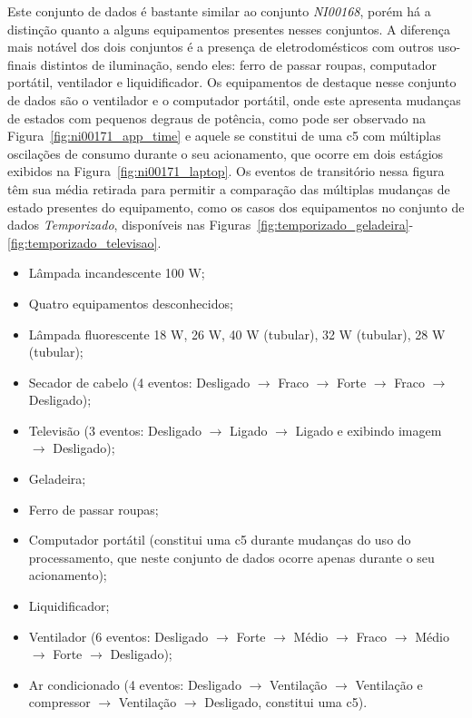 Este conjunto de dados é bastante similar ao conjunto \emph{NI00168},
porém há a distinção quanto a alguns equipamentos presentes nesses
conjuntos. A diferença mais notável dos dois conjuntos é a presença de
eletrodomésticos com outros uso-finais distintos de iluminação, sendo
eles: ferro de passar roupas, computador portátil, ventilador e
liquidificador.  Os equipamentos de destaque nesse conjunto de dados
são o ventilador e o computador portátil, onde este apresenta mudanças
de estados com pequenos degraus de potência, como pode ser observado
na Figura~\ref{fig:ni00171_app_time} e aquele se constitui de uma
\acs{c5} com múltiplas oscilações de consumo durante o seu
acionamento, que ocorre em dois estágios exibidos na
Figura~\ref{fig:ni00171_laptop}. Os eventos de transitório nessa
figura têm sua média retirada para permitir a comparação das múltiplas
mudanças de estado presentes do equipamento, como os casos dos
equipamentos no conjunto de dados \emph{Temporizado}, disponíveis nas 
Figuras~\ref{fig:temporizado_geladeira}-\ref{fig:temporizado_televisao}.

\begin{itemize}
\item Lâmpada incandescente 100 W;
\item Quatro equipamentos desconhecidos;
\item Lâmpada fluorescente 18 W, 26 W, 40 W (tubular), 32 W (tubular),
28 W (tubular);
\item Secador de cabelo (4 eventos: Desligado $\rightarrow$ Fraco
$\rightarrow$ Forte $\rightarrow$ Fraco $\rightarrow$ Desligado);
\item Televisão (3 eventos: Desligado $\rightarrow$ Ligado
$\rightarrow$ Ligado e exibindo imagem $\rightarrow$
Desligado);
\item Geladeira;
\item Ferro de passar roupas;
\item Computador portátil (constitui uma \acs{c5} durante mudanças do
uso do processamento, que neste conjunto de dados ocorre apenas
durante o seu acionamento);
\item Liquidificador;
\item Ventilador (6 eventos: Desligado $\rightarrow$ Forte $\rightarrow$
Médio $\rightarrow$ Fraco $\rightarrow$ Médio $\rightarrow$ Forte
$\rightarrow$ Desligado);
\item Ar condicionado (4 eventos: Desligado $\rightarrow$ Ventilação
$\rightarrow$ Ventilação e compressor $\rightarrow$ Ventilação
$\rightarrow$ Desligado, constitui uma \acs{c5}).
\end{itemize}
 
